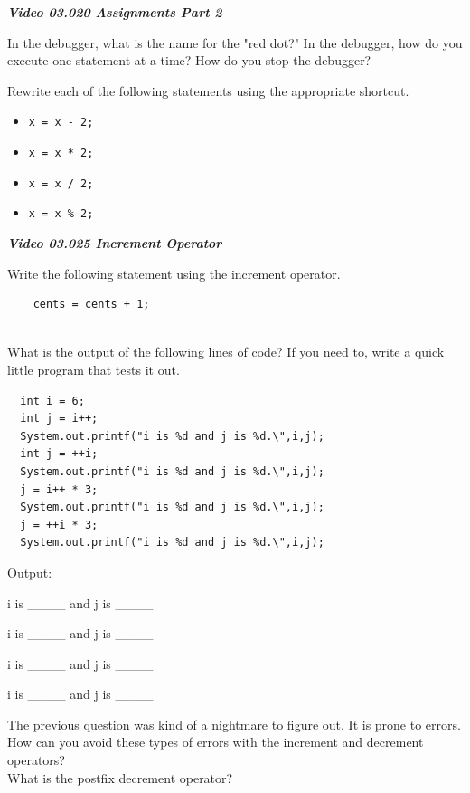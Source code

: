 \documentclass[letterpaper,11pt]{exam}
\newcommand{\videoheading}[1]{\Large\textbf{\textit{#1}}}
\begin{document}
\begin{questions}
\videoheading{Video 03.020 Assignments Part 2}

\question In the debugger, what is the name for the "red dot?"
\question In the debugger, how do you execute one statement at a time?
\question How do you stop the debugger?

\begin{samepage}
  \question Rewrite each of the following statements using the appropriate shortcut.
  \begin{itemize}
    \item \texttt{x = x - 2;}
    \item \texttt{x = x * 2;}
    \item \texttt{x = x / 2;}
    \item \texttt{x = x \% 2;}
  \end{itemize}
  \vspace{0.5cm}
\end{samepage}

\videoheading{Video 03.025 Increment Operator}

\question Write the following statement using the increment operator.

\begin{verbatim}
    cents = cents + 1;


\end{verbatim}

\begin{samepage}
\question What is the output of the following lines of code?  If you need to, write a quick little program that tests it out.
\begin{verbatim}
  int i = 6;
  int j = i++;
  System.out.printf("i is %d and j is %d.\",i,j);
  int j = ++i;
  System.out.printf("i is %d and j is %d.\",i,j);
  j = i++ * 3;
  System.out.printf("i is %d and j is %d.\",i,j);
  j = ++i * 3;
  System.out.printf("i is %d and j is %d.\",i,j);
\end{verbatim}

Output:

    i is \_\_\_\_ and j is \_\_\_\_

    i is \_\_\_\_ and j is \_\_\_\_

    i is \_\_\_\_ and j is \_\_\_\_

    i is \_\_\_\_ and j is \_\_\_\_
\end{samepage}
\question
The previous question was kind of a nightmare to figure out.  It is prone to errors.  How can you avoid these types of errors with the increment and decrement operators?
\\
\question What is the postfix decrement operator?


\end{questions}
\end{document}

